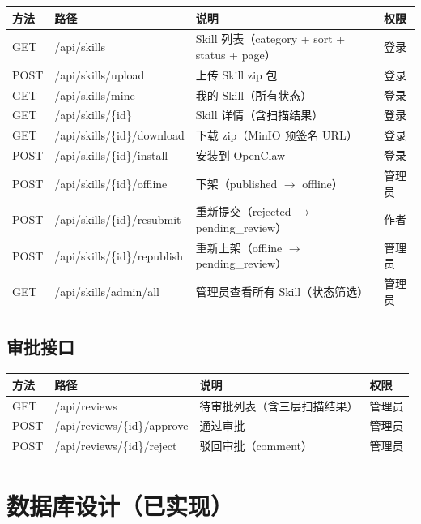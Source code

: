 \documentclass[11pt,a4paper]{article}
\begin{document}
\begin{table}[h]
\centering
\begin{tabularx}{\linewidth}{lllX}
\toprule
\textbf{方法} & \textbf{路径} & \textbf{说明} & \textbf{权限} \\
\midrule
GET & /api/skills & Skill 列表（category + sort + status + page） & 登录 \\
POST & /api/skills/upload & 上传 Skill zip 包 & 登录 \\
GET & /api/skills/mine & 我的 Skill（所有状态） & 登录 \\
GET & /api/skills/\{id\} & Skill 详情（含扫描结果） & 登录 \\
GET & /api/skills/\{id\}/download & 下载 zip（MinIO 预签名 URL） & 登录 \\
POST & /api/skills/\{id\}/install & 安装到 OpenClaw & 登录 \\
POST & /api/skills/\{id\}/offline & 下架（published $\to$ offline） & 管理员 \\
POST & /api/skills/\{id\}/resubmit & 重新提交（rejected $\to$ pending\_review） & 作者 \\
POST & /api/skills/\{id\}/republish & 重新上架（offline $\to$ pending\_review） & 管理员 \\
GET & /api/skills/admin/all & 管理员查看所有 Skill（状态筛选） & 管理员 \\
\bottomrule
\end{tabularx}
\end{table}

\subsection{审批接口}

\begin{table}[h]
\centering
\begin{tabularx}{\linewidth}{lllX}
\toprule
\textbf{方法} & \textbf{路径} & \textbf{说明} & \textbf{权限} \\
\midrule
GET & /api/reviews & 待审批列表（含三层扫描结果） & 管理员 \\
POST & /api/reviews/\{id\}/approve & 通过审批 & 管理员 \\
POST & /api/reviews/\{id\}/reject & 驳回审批（comment） & 管理员 \\
\bottomrule
\end{tabularx}
\end{table}

\section{数据库设计（已实现）}
\end{document}
